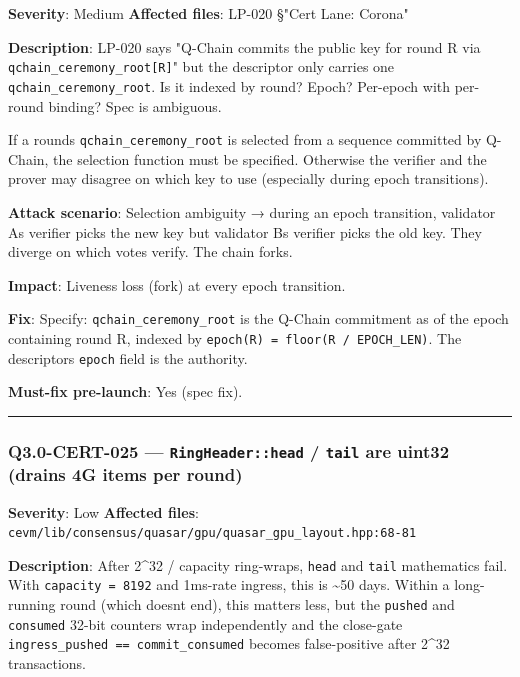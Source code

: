 \documentclass[
]{article}
\begin{document}
\textbf{Severity}: Medium \textbf{Affected files}: LP-020 §"Cert Lane:
Corona"

\textbf{Description}: LP-020 says "Q-Chain commits the public key for
round R via \texttt{qchain\_ceremony\_root{[}R{]}}" but the descriptor
only carries one \texttt{qchain\_ceremony\_root}. Is it indexed by
round? Epoch? Per-epoch with per-round binding? Spec is ambiguous.

If a round\textquotesingle s \texttt{qchain\_ceremony\_root} is selected
from a sequence committed by Q-Chain, the selection function must be
specified. Otherwise the verifier and the prover may disagree on which
key to use (especially during epoch transitions).

\textbf{Attack scenario}: Selection ambiguity → during an epoch
transition, validator A\textquotesingle s verifier picks the new key but
validator B\textquotesingle s verifier picks the old key. They diverge
on which votes verify. The chain forks.

\textbf{Impact}: Liveness loss (fork) at every epoch transition.

\textbf{Fix}: Specify: \texttt{qchain\_ceremony\_root} is the Q-Chain
commitment as of the epoch containing round R, indexed by
\texttt{epoch(R)\ =\ floor(R\ /\ EPOCH\_LEN)}. The
descriptor\textquotesingle s \texttt{epoch} field is the authority.

\textbf{Must-fix pre-launch}: Yes (spec fix).

\begin{center}\rule{0.5\linewidth}{0.5pt}\end{center}

\subsubsection{\texorpdfstring{Q3.0-CERT-025 ---
\texttt{RingHeader::head} / \texttt{tail} are uint32 (drains 4G items
per
round)}{Q3.0-CERT-025 --- RingHeader::head / tail are uint32 (drains 4G items per round)}}\label{q30-cert-025--ringheaderhead--tail-are-uint32-drains-4g-items-per-round}

\textbf{Severity}: Low \textbf{Affected files}:
\texttt{cevm/lib/consensus/quasar/gpu/quasar\_gpu\_layout.hpp:68-81}

\textbf{Description}: After 2\^{}32 / capacity ring-wraps, \texttt{head}
and \texttt{tail} mathematics fail. With \texttt{capacity\ =\ 8192} and
1ms-rate ingress, this is \textasciitilde50 days. Within a long-running
round (which doesn\textquotesingle t end), this matters less, but the
\texttt{pushed} and \texttt{consumed} 32-bit counters wrap independently
and the close-gate \texttt{ingress\_pushed\ ==\ commit\_consumed}
becomes false-positive after 2\^{}32 transactions.
\end{document}
